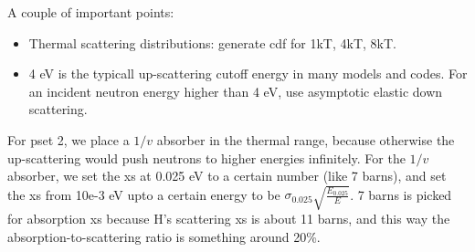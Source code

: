 \documentclass{school-22.211-notes}
\begin{document}
A couple of important points:
\begin{itemize}
\item Thermal scattering distributions: generate cdf for 1kT, 4kT, 8kT.  
\item 4 eV is the typicall up-scattering cutoff energy in many models and codes. For an incident neutron energy higher than 4 eV, use asymptotic elastic down scattering. 
\end{itemize}

For pset 2, we place a $1/v$ absorber in the thermal range, because otherwise the up-scattering would push neutrons to higher energies infinitely. For the $1/v$ absorber, we set the xs at 0.025 eV to a certain number (like 7 barns), and set the xs from 10e-3 eV upto a certain energy to be $\sigma_{0.025} \sqrt{\frac{E_{0.025}}{E}}$. 7 barns is picked for absorption xs because H's scattering xs is about 11 barns, and this way the absorption-to-scattering ratio is something around 20\%. 
\end{document}
